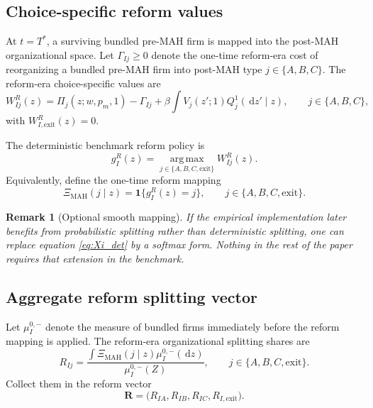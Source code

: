 \documentclass[12pt]{article}
\newtheorem{remark}{Remark}
\newcommand{\1}{\mathbf{1}}
\newcommand{\dd}{\,\mathrm{d}}
\newcommand{\argmax}{\operatorname*{arg\,max}}
\begin{document}
\subsection{Choice-specific reform values}

At $t=T^*$, a surviving bundled pre-MAH firm is mapped into the post-MAH organizational space. Let $\Gamma_{Ij}\ge 0$ denote the one-time reform-era cost of reorganizing a bundled pre-MAH firm into post-MAH type $j\in\{A,B,C\}$. The reform-era choice-specific values are
\begin{equation}
W_{Ij}^{R}(z)=\Pi_j(z;w,p_m,1)-\Gamma_{Ij}+\beta\int V_j(z';1)Q_j^1(\dd z'\mid z),
\qquad j\in\{A,B,C\},
\label{eq:reform_choice}
\end{equation}
with $W_{I,\mathrm{exit}}^{R}(z)=0$.

The deterministic benchmark reform policy is
\begin{equation}
g_I^{R}(z)=\argmax_{j\in\{A,B,C,\mathrm{exit}\}} W_{Ij}^{R}(z).
\label{eq:reform_policy}
\end{equation}
Equivalently, define the one-time reform mapping
\begin{equation}
\Xi_{\mathrm{MAH}}(j\mid z)=\1\{g_I^R(z)=j\},
\qquad j\in\{A,B,C,\mathrm{exit}\}.
\label{eq:Xi_det}
\end{equation}

\begin{remark}[Optional smooth mapping]
If the empirical implementation later benefits from probabilistic splitting rather than deterministic splitting, one can replace equation \eqref{eq:Xi_det} by a softmax form. Nothing in the rest of the paper requires that extension in the benchmark.
\end{remark}

\subsection{Aggregate reform splitting vector}

Let $\mu_I^{0,-}$ denote the measure of bundled firms immediately before the reform mapping is applied. The reform-era organizational splitting shares are
\begin{equation}
R_{Ij}=\frac{\int \Xi_{\mathrm{MAH}}(j\mid z)\mu_I^{0,-}(\dd z)}{\mu_I^{0,-}(Z)},
\qquad j\in\{A,B,C,\mathrm{exit}\}.
\label{eq:Rij}
\end{equation}
Collect them in the reform vector
\begin{equation}
\mathbf R=\bigl(R_{IA},R_{IB},R_{IC},R_{I,\mathrm{exit}}\bigr).
\label{eq:Rvector}
\end{equation}
\end{document}
